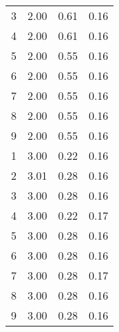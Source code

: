 \begin{table}[htbp]
\begin{tabular}{cccc}
3 & 2.00 & 0.61 & 0.16 \\
4 & 2.00 & 0.61 & 0.16 \\
5 & 2.00 & 0.55 & 0.16 \\
6 & 2.00 & 0.55 & 0.16 \\
7 & 2.00 & 0.55 & 0.16 \\
8 & 2.00 & 0.55 & 0.16 \\
9 & 2.00 & 0.55 & 0.16 \\
\cmidrule(lr){1-4}
1 & 3.00 & 0.22 & 0.16 \\
2 & 3.01 & 0.28 & 0.16 \\
3 & 3.00 & 0.28 & 0.16 \\
4 & 3.00 & 0.22 & 0.17 \\
5 & 3.00 & 0.28 & 0.16 \\
6 & 3.00 & 0.28 & 0.16 \\
7 & 3.00 & 0.28 & 0.17 \\
8 & 3.00 & 0.28 & 0.16 \\
9 & 3.00 & 0.28 & 0.16 \\
\bottomrule
\end{tabular}
\end{table}

